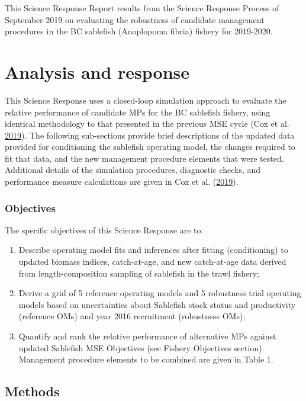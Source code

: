 \documentclass[11pt]{book}
\begin{document}
This Science Response Report results from the Science Response Process of September 2019 on evaluating the robustness of candidate management procedures in the BC sablefish (Anoplopoma fibria) fishery for 2019-2020.

\hypertarget{analysis-and-response}{%
\section{Analysis and response}\label{analysis-and-response}}

This Science Response uses a closed-loop simulation approach to evaluate the relative performance of candidate MPs for the BC sablefish fishery, using identical methodology to that presented in the previous MSE cycle (Cox et al. \protect\hyperlink{ref-cox2019evaluating}{2019}). The following sub-sections provide brief descriptions of the updated data provided for conditioning the sablefish operating model, the changes required to fit that data, and the new management procedure elements that were tested. Additional details of the simulation procedures, diagnostic checks, and performance measure calculations are given in Cox et al. (\protect\hyperlink{ref-cox2019evaluating}{2019}).

\hypertarget{objectives}{%
\subsubsection{Objectives}\label{objectives}}

The specific objectives of this Science Response are to:
\begin{enumerate}
\def\labelenumi{\arabic{enumi}.}

\item
  Describe operating model fits and inferences after fitting (conditioning) to updated biomass indices, catch-at-age, and new catch-at-age data derived from length-composition sampling of sablefish in the trawl fishery;
\item
  Derive a grid of 5 reference operating models and 5 robustness trial operating models based on uncertainties about Sablefish stock status and productivity (reference OMs) and year 2016 recruitment (robustness OMs);
\item
  Quantify and rank the relative performance of alternative MPs against updated Sablefish MSE Objectives (see Fishery Objectives section). Management procedure elements to be combined are given in Table 1.
\end{enumerate}
\hypertarget{methods}{%
\subsection{Methods}\label{methods}}
\end{document}
